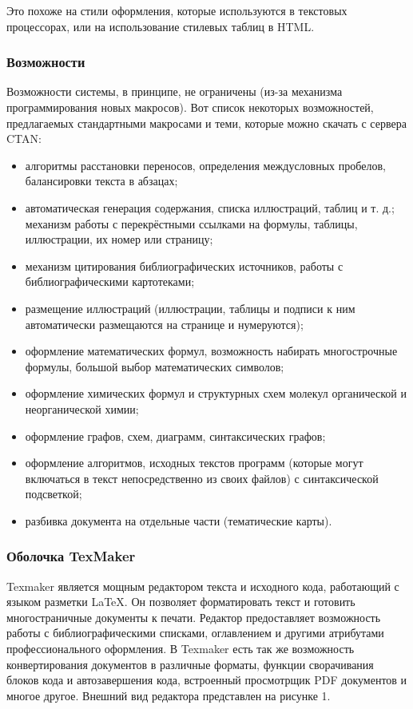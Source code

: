 \documentclass[10pt,a4paper]{article}
\begin{document}
Это похоже на стили оформления, которые используются в текстовых процессорах, или на использование стилевых таблиц в HTML.

\subsubsection{Возможности}
\hspace{0,6cm}Возможности системы, в принципе, не ограничены (из-за механизма программирования новых макросов). Вот список некоторых возможностей, предлагаемых стандартными макросами и теми, которые можно скачать  с сервера CTAN:
\begin{itemize}
\item алгоритмы расстановки переносов, определения междусловных пробелов, балансировки текста в абзацах;
\item автоматическая генерация содержания, списка иллюстраций, таблиц и т. д.;
механизм работы с перекрёстными ссылками на формулы, таблицы, иллюстрации, их номер или страницу;
\item механизм цитирования библиографических источников, работы с библиографическими картотеками;
\item размещение иллюстраций (иллюстрации, таблицы и подписи к ним автоматически размещаются на странице и нумеруются);
\item оформление математических формул, возможность набирать многострочные формулы, большой выбор математических символов;
\item оформление химических формул и структурных схем молекул органической и неорганической химии;
\item оформление графов, схем, диаграмм, синтаксических графов;
\item оформление алгоритмов, исходных текстов программ (которые могут включаться в текст непосредственно из своих файлов) с синтаксической подсветкой;
\item разбивка документа на отдельные части (тематические карты).
\end{itemize}

\subsubsection{Оболочка TexMaker}

\hspace{0,6cm}Texmaker является мощным редактором текста и исходного кода, работающий с языком разметки LaTeX. Он позволяет форматировать текст и готовить многостраничные документы к печати. Редактор предоставляет возможность работы с библиографическими списками, оглавлением и другими атрибутами профессионального оформления. В Texmaker есть так же возможность конвертирования документов в различные форматы, функции сворачивания блоков кода и автозавершения кода, встроенный просмотрщик PDF документов и многое другое. Внешний вид редактора представлен на рисунке 1.
\end{document}
